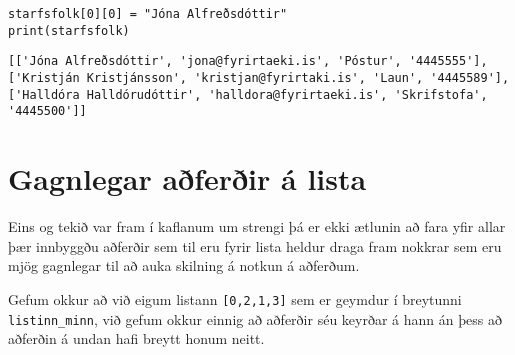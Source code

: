 \begin{lstlisting}[caption=Unnið með gögn úr lista, label=lst:listar-gagnabreyting]
starfsfolk[0][0] = "Jóna Alfreðsdóttir"
print(starfsfolk)
\end{lstlisting}
\lstset{style=uttak}
\begin{lstlisting}
[['Jóna Alfreðsdóttir', 'jona@fyrirtaeki.is', 'Póstur', '4445555'], ['Kristján Kristjánsson', 'kristjan@fyrirtaki.is', 'Laun', '4445589'], ['Halldóra Halldórudóttir', 'halldora@fyrirtaeki.is', 'Skrifstofa', '4445500']]
\end{lstlisting}
\lstset{style=venjulegt}

\section{Gagnlegar aðferðir á lista}\label{uk:aðferðir-listar}

Eins og tekið var fram í kaflanum um strengi þá er ekki ætlunin að fara yfir allar þær innbyggðu aðferðir sem til eru fyrir lista heldur draga fram nokkrar sem eru mjög gagnlegar til að auka skilning á notkun á aðferðum.

Gefum okkur að við eigum listann \texttt{[0,2,1,3]} sem er geymdur í breytunni \texttt{listinn\_minn}, við gefum okkur einnig að aðferðir séu keyrðar á hann án þess að aðferðin á undan hafi breytt honum neitt.

